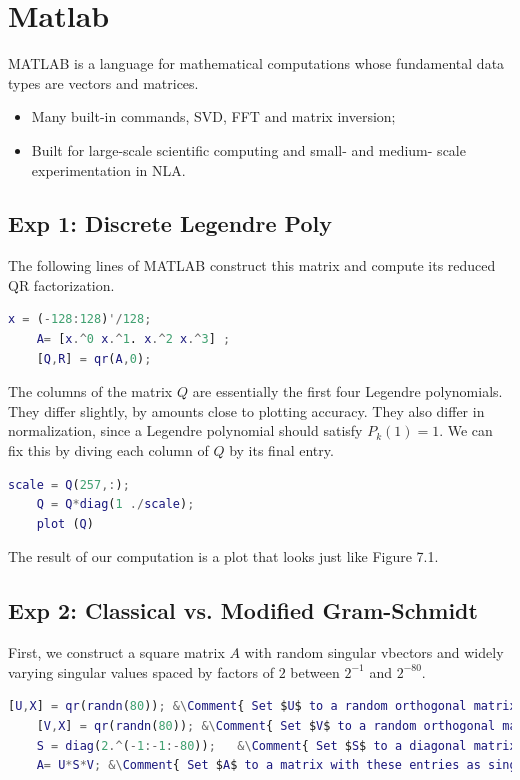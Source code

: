 \newpage 
\chapter{Matlab} 

MATLAB is a language for mathematical computations whose fundamental data types are vectors and matrices. 
\begin{itemize}
    \item Many built-in commands, SVD, FFT and matrix inversion; 
    \item Built for large-scale scientific computing and small- and medium- scale experimentation in NLA.
\end{itemize}

\section{Exp 1: Discrete Legendre Poly} 
The following lines of MATLAB construct this matrix and compute its reduced QR factorization.
\begin{lstlisting}[language=Matlab]
    x = (-128:128)'/128;
    A= [x.^0 x.^1. x.^2 x.^3] ;
    [Q,R] = qr(A,0);
\end{lstlisting}
The columns of the matrix $Q$ are essentially the first four Legendre polynomials. They differ slightly, by amounts close to plotting accuracy. They also differ in normalization, since a Legendre polynomial should satisfy $P_k(1)=1$. We can fix this by diving each column of $Q$ by its final entry. 
\begin{lstlisting}[language=Matlab] 
    scale = Q(257,:);
    Q = Q*diag(1 ./scale);
    plot (Q)
\end{lstlisting}
 
The result of our computation is a plot that looks just like Figure 7.1. 

\section{Exp 2: Classical vs. Modified Gram-Schmidt} 

First, we construct a square matrix $A$ with random singular vbectors and widely varying singular values spaced by factors of $2$ between $2^{-1}$ and $2^{-80}$.  
\begin{lstlisting}[language=matlab]
    [U,X] = qr(randn(80)); &\Comment{ Set $U$ to a random orthogonal matrix. } &
    [V,X] = qr(randn(80)); &\Comment{ Set $V$ to a random orthogonal matrix. } &
    S = diag(2.^(-1:-1:-80));   &\Comment{ Set $S$ to a diagonal matrix with exponentially graded entries. } &
    A= U*S*V; &\Comment{ Set $A$ to a matrix with these entries as singular values. } &
\end{lstlisting}

